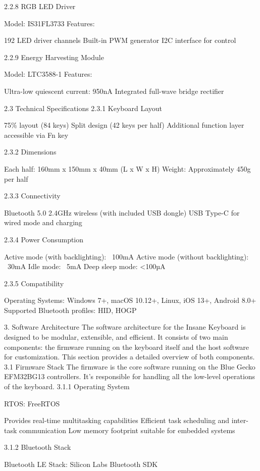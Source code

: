 \documentclass[a4paper,11pt]{article}%
\begin{document}
2.2.8 RGB LED Driver

Model: IS31FL3733
Features:

192 LED driver channels
Built-in PWM generator
I2C interface for control



2.2.9 Energy Harvesting Module

Model: LTC3588-1
Features:

Ultra-low quiescent current: 950nA
Integrated full-wave bridge rectifier



2.3 Technical Specifications
2.3.1 Keyboard Layout

75\% layout (84 keys)
Split design (42 keys per half)
Additional function layer accessible via Fn key

2.3.2 Dimensions

Each half: 160mm x 150mm x 40mm (L x W x H)
Weight: Approximately 450g per half

2.3.3 Connectivity

Bluetooth 5.0
2.4GHz wireless (with included USB dongle)
USB Type-C for wired mode and charging

2.3.4 Power Consumption

Active mode (with backlighting): ~100mA
Active mode (without backlighting): ~30mA
Idle mode: ~5mA
Deep sleep mode: <100µA

2.3.5 Compatibility

Operating Systems: Windows 7+, macOS 10.12+, Linux, iOS 13+, Android 8.0+
Supported Bluetooth profiles: HID, HOGP


3. Software Architecture
The software architecture for the Insane Keyboard is designed to be modular, extensible, and efficient. It consists of two main components: the firmware running on the keyboard itself and the host software for customization. This section provides a detailed overview of both components.
3.1 Firmware Stack
The firmware is the core software running on the Blue Gecko EFM32BG13 controllers. It's responsible for handling all the low-level operations of the keyboard.
3.1.1 Operating System

RTOS: FreeRTOS

Provides real-time multitasking capabilities
Efficient task scheduling and inter-task communication
Low memory footprint suitable for embedded systems



3.1.2 Bluetooth Stack

Bluetooth LE Stack: Silicon Labs Bluetooth SDK
\end{document}
